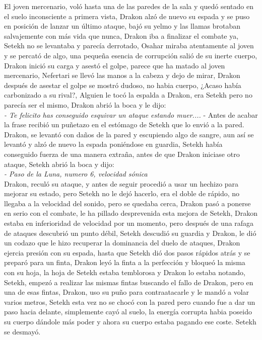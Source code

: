 El joven mercenario, voló hasta una de las paredes de la sala y quedó sentado en el suelo inconsciente a primera vista, Drakon alzó de nuevo su espada y se puso en posición de lanzar un último ataque, bajó su yelmo y las llamas brotaban salvajemente con más vida que nunca, Drakon iba a finalizar el combate ya, Setekh no se levantaba y parecía derrotado, Osahar miraba atentamente al joven y se percató de algo,
una pequeña esencia de corrupción salió de su inerte cuerpo, Drakon inició su carga y asestó el golpe, parece que ha matado al joven mercenario, Nefertari se llevó las manos a la cabeza y dejo de mirar, Drakon después de asestar el golpe se mostró dudoso, no habia cuerpo, ¿Acaso había carbonizado a su rival?, Alguien le tocó la espalda a Drakon, era Setekh pero no parecía ser el mismo, Drakon abrió la boca y le dijo:\\
\textit{- Te felicito has conseguido esquivar un ataque estando muer....} - Antes de acabar la frase recibió un puñetazo en el estómago de Setekh que lo envió a la pared.\\
Drakon, se levantó con daños de la pared y escupiendo algo de sangre, aun así se levantó y alzó de nuevo la espada poniéndose en guardia, Setekh había conseguido fuerza de una manera extraña, antes de que Drakon iniciase otro ataque, Setekh abrió la boca y dijo:\\
\textit{- Paso de la Luna, numero 6, velocidad sónica}\\
Drakon, reculó su ataque, y antes de seguir procedió a usar un hechizo para mejorar su estado, pero Setekh no le dejó hacerlo, era el doble de rápido, no llegaba a la velocidad del sonido, pero se quedaba cerca, Drakon pasó a ponerse en serio con el combate, le ha pillado desprevenida esta mejora de Setekh, Drakon estaba en inferioridad de velocidad por un momento, pero después de una rafaga de ataques descubrió un punto débil, Setekh descudió su guardia y Drakon,
le dió un codazo que le hizo recuperar la dominancia del duelo de ataques, Drakon ejercia presión con su espada, hasta que Setekh dió dos pasos rápidos atrás y se preparó para un finta, Drakon leyó la finta a la perfección y bloqueó la misma con su hoja, la hoja de Setekh estaba temblorosa y Drakon lo estaba notando, Setekh, empezó a realizar las mismas fintas buscando el fallo de Drakon, pero en una de esas fintas, Drakon, uso su puño para contraatacarle y le mandó a volar varios metros,
Setekh esta vez no se chocó con la pared pero cuando fue a dar un paso hacia delante, simplemente cayó al suelo, la energía corrupta habia poseido su cuerpo dándole más poder y ahora su cuerpo estaba pagando ese coste. Setekh se desmayó.



